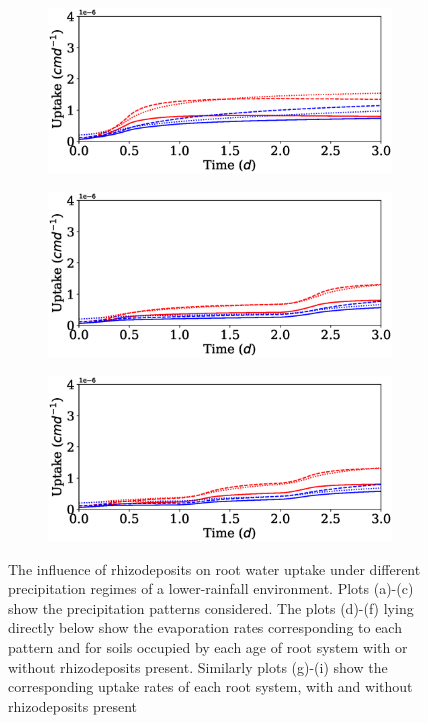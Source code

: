\documentclass[11pt,a4paper]{article}
\numberwithin{equation}{section}
\begin{document}
\begin{figure}
	\begin{subfigure}{0.32\textwidth}
		\includegraphics[width = \linewidth, keepaspectratio] {up_ppat1ptot0_12.eps}
		\caption{}
	\end{subfigure}
	\begin{subfigure}{0.32\textwidth}
		\includegraphics[width = \linewidth, keepaspectratio] {up_ppat2ptot0_12.eps}
		\caption{}
	\end{subfigure}
	\begin{subfigure}{0.32\textwidth}
		\includegraphics[width = \linewidth, keepaspectratio] {up_ppat3ptot0_12.eps}
		\caption{}
	\end{subfigure}
	\caption{The influence of rhizodeposits on root water uptake under different precipitation regimes of a lower-rainfall environment. Plots (a)-(c) show the precipitation patterns considered. The plots (d)-(f) lying directly below show the evaporation rates corresponding to each pattern and for soils occupied by each age of root system with or without rhizodeposits present. Similarly plots (g)-(i) show the corresponding uptake rates of each root system, with and without rhizodeposits present}
	\label{figure: almeria_precip_evap_up}
\end{figure}
\end{document}
